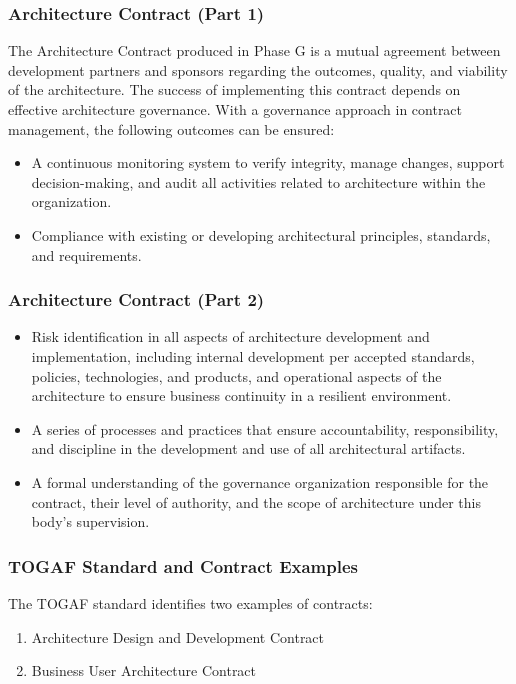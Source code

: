 \documentclass[aspectratio=169, table]{beamer}
\begin{document}
\begin{frame}
	\frametitle{Architecture Contract (Part 1)}
	
	The Architecture Contract produced in Phase G is a mutual agreement between development partners and sponsors regarding the outcomes, quality, and viability of the architecture. The success of implementing this contract depends on effective architecture governance. With a governance approach in contract management, the following outcomes can be ensured:
	
	\begin{itemize}
		\item A continuous monitoring system to verify integrity, manage changes, support decision-making, and audit all activities related to architecture within the organization.
		\item Compliance with existing or developing architectural principles, standards, and requirements.
	\end{itemize}
\end{frame}

\begin{frame}
	\frametitle{Architecture Contract (Part 2)}
	
	\begin{itemize}
		\item Risk identification in all aspects of architecture development and implementation, including internal development per accepted standards, policies, technologies, and products, and operational aspects of the architecture to ensure business continuity in a resilient environment.
		\item A series of processes and practices that ensure accountability, responsibility, and discipline in the development and use of all architectural artifacts.
		\item A formal understanding of the governance organization responsible for the contract, their level of authority, and the scope of architecture under this body's supervision.
	\end{itemize}
\end{frame}


\begin{frame}
	\frametitle{TOGAF Standard and Contract Examples}
	
	The TOGAF standard identifies two examples of contracts:
	\begin{enumerate}
		\item Architecture Design and Development Contract
		\item Business User Architecture Contract
	\end{enumerate}
\end{frame}
\end{document}
